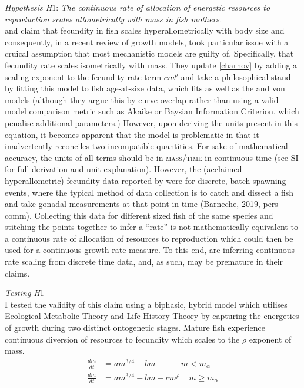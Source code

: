 \documentclass[a4paper]{article} %
\begin{document}
\textit{Hypothesis H}1: \textit{The continuous rate of allocation of energetic resources to reproduction scales allometrically with mass in fish mothers.}\\
\cite{Barneche2018d} and \cite{Marshall2019b} claim that fecundity in fish scales hyperallometrically with body size and consequently, in a recent review of growth models, \cite{Marshall2019b} took particular issue with a cruical assumption that most mechanistic models are guilty of. Specifically, that fecundity rate scales isometrically with mass. They update \cref{charnov} by adding a scaling exponent to the fecundity rate term $cm^{\rho}$ and take a philosophical stand by fitting this model to fish age-at-size data, which fits as well as the \cite{West2001} and von \cite{vonBert1938} models (although they argue this by curve-overlap rather than using a valid model comparison metric such as Akaike or Baysian Information Criterion, which penalise additional parameters.) However, upon deriving the units present in this equation, it becomes apparent that the \cite{Marshall2019b} model is problematic in that it inadvertently reconciles two incompatible quantities. For sake of mathematical accuracy, the units of all terms should be in \textsc{mass/time} in continuous time (see SI for full derivation and unit explanation). However, the (acclaimed hyperallometric) fecundity data reported by \cite{Barneche2018d} were for discrete, batch spawning events, where the typical method of data collection is to catch and dissect a fish and take gonadal measurements at that point in time (Barneche, 2019, pers comm). Collecting this data for different sized fish of the same species and stitching the points together to infer a ``rate'' is not mathematically equivalent to a continuous rate of allocation of resources to reproduction which could then be used for a continuous growth rate measure. To this end, \cite{Marshall2019b} are inferring continuous rate scaling from discrete time data, and, as such, may be premature in their claims.  

\textit{Testing H}1 \\
I tested the validity of this claim using a biphasic, hybrid model which utilises Ecological Metabolic Theory and Life History Theory by capturing the energetics of growth during two distinct ontogenetic stages. Mature fish experience continuous diversion of resources to fecundity which scales to the $\rho$ exponent of mass.
\begin{align}
    \frac{dm}{dt} &= am^{3/4} - bm \ \ \ \ \ \ \ \ \ \ \ \ \ \ m < m_{\alpha} \label{luke_model_juvenile}\\
    \frac{dm}{dt} &= am^{3/4} - bm - cm^{\rho} \ \ \ \ \ m \geq m_{\alpha} \label{luke_model}
\end{align}
\end{document}

